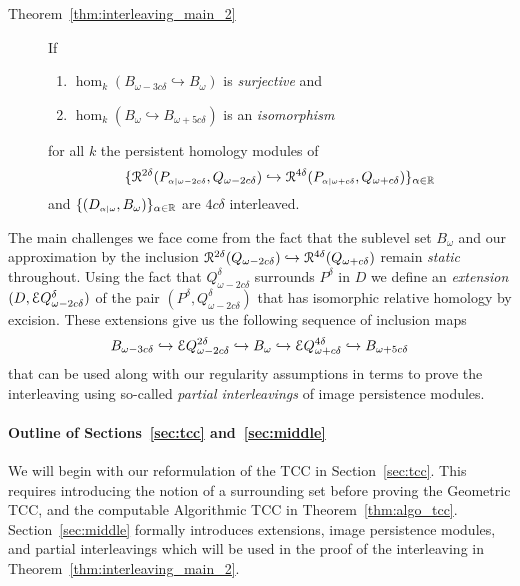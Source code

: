 \begin{description}
  \item[Theorem~\ref{thm:interleaving_main_2}] If
    \begin{enumerate}
      \item $\hom_k(B_{\omega-3c\delta}\hookrightarrow B_\omega)$ is \emph{surjective} and
      \item $\hom_k(B_\omega\hookrightarrow B_{\omega+5c\delta})$ is an \emph{isomorphism}
    \end{enumerate}
    for all $k$ the persistent homology modules of
    \[ \{\mathcal{R}^{2\delta}(P_{\scriptscriptstyle \alpha\mid \omega-2c\delta}, Q_{\omega-2c\delta})\hookrightarrow \mathcal{R}^{4\delta}(P_{\scriptscriptstyle \alpha\mid \omega+c\delta}, Q_{\omega+c\delta})\}_{\alpha\in\mathbb{R}}\]
    and $\{(D_{\scriptscriptstyle \alpha\mid \omega}, B_\omega)\}_{\alpha\in\mathbb{R}}$ are $4c\delta$ interleaved.
\end{description}

The main challenges we face come from the fact that the sublevel set $B_\omega$ and our approximation by the inclusion $\mathcal{R}^{2\delta}(Q_{\omega-2c\delta})\hookrightarrow \mathcal{R}^{4\delta}(Q_{\omega+c\delta})$ remain \emph{static} throughout.
Using the fact that $Q_{\omega-2c\delta}^\delta$ surrounds $P^\delta$ in $D$ we define an \emph{extension} $(D,\mathcal{E} Q_{\omega-2c\delta}^\delta)$ of the pair $(P^\delta, Q_{\omega-2c\delta}^\delta)$ that has isomorphic relative homology by excision.
These extensions give us the following sequence of inclusion maps
\[ B_{\omega-3c\delta}\hookrightarrow \mathcal{E} Q_{\omega-2c\delta}^{2\delta}\hookrightarrow B_\omega\hookrightarrow \mathcal{E} Q_{\omega+c\delta}^{4\delta}\hookrightarrow B_{\omega+5c\delta}\]
that can be used along with our regularity assumptions in terms to prove the interleaving using so-called \emph{partial interleavings} of image persistence modules.


\paragraph{Outline of Sections~\ref{sec:tcc} and~\ref{sec:middle}}

We will begin with our reformulation of the TCC in Section~\ref{sec:tcc}.
This requires introducing the notion of a surrounding set before proving the Geometric TCC, and the computable Algorithmic TCC in Theorem~\ref{thm:algo_tcc}.
Section~\ref{sec:middle} formally introduces extensions, image persistence modules, and partial interleavings which will be used in the proof of the interleaving in Theorem~\ref{thm:interleaving_main_2}.

